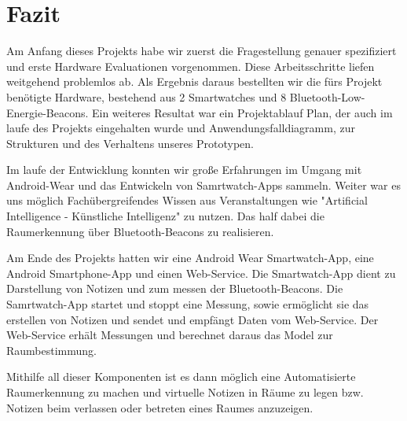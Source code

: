 \section{Fazit}

Am Anfang dieses Projekts habe wir zuerst die Fragestellung genauer spezifiziert und erste Hardware Evaluationen vorgenommen. Diese Arbeitsschritte liefen weitgehend problemlos ab. Als Ergebnis daraus bestellten wir die fürs Projekt benötigte Hardware, bestehend aus 2 Smartwatches und 8 Bluetooth-Low-Energie-Beacons. Ein weiteres Resultat war ein Projektablauf Plan, der auch im laufe des Projekts eingehalten wurde und Anwendungsfalldiagramm, zur Strukturen und des Verhaltens unseres Prototypen. 

Im laufe der Entwicklung konnten wir große Erfahrungen im Umgang mit Android-Wear und das Entwickeln von Samrtwatch-Apps sammeln. Weiter war es uns möglich Fachübergreifendes Wissen aus Veranstaltungen wie "Artificial Intelligence - Künstliche Intelligenz" zu nutzen. Das half dabei die Raumerkennung über Bluetooth-Beacons zu realisieren.

Am Ende des Projekts hatten wir eine Android Wear Smartwatch-App, eine Android Smartphone-App und einen Web-Service. Die Smartwatch-App dient zu Darstellung von Notizen und zum messen der Bluetooth-Beacons. Die Samrtwatch-App startet und stoppt eine Messung, sowie ermöglicht sie das erstellen von Notizen und sendet und empfängt Daten vom Web-Service. Der Web-Service erhält Messungen und berechnet daraus das Model zur Raumbestimmung.

Mithilfe all dieser Komponenten ist es dann möglich eine Automatisierte Raumerkennung zu machen und virtuelle Notizen in Räume zu legen bzw. Notizen beim verlassen oder betreten eines Raumes anzuzeigen.